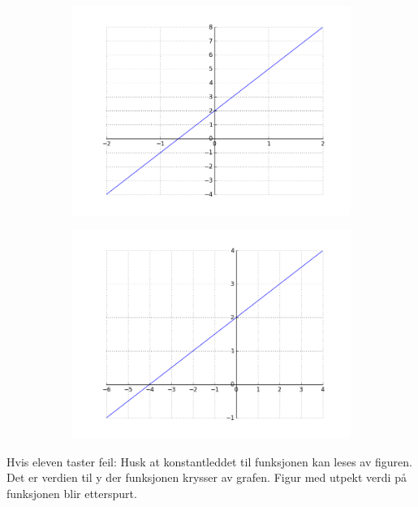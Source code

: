 \documentclass[12pt,twoside,onecolumn]{article}
\begin{document}
\begin{figure}[h!]
\begin{subfigure}{.5\textwidth}
    \includegraphics[scale = 0.5]{figures/3Xp2.png}
    \end{subfigure}%
    \begin{subfigure}{.5\textwidth}
    \centering
    \includegraphics[scale = 0.5]{figures/05Xp2.png}
    \end{subfigure}
\end{figure}
{\color{Maroon}Hvis eleven taster feil: Husk at konstantleddet til funksjonen kan leses av figuren. Det er verdien til y der funksjonen krysser av grafen.}
{\color{Maroon}Figur med utpekt verdi på funksjonen blir etterspurt.}
\end{document}
